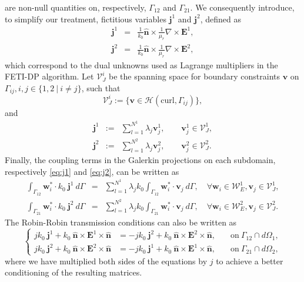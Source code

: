 \noindent are non-null quantities on, respectively, $\Gamma_{12}$ and $\Gamma_{21}$.
%
\noindent We consequently introduce, to simplify our treatment, fictitious variables $\mathbf{j}^1$ and $\mathbf{j}^2$, defined as
\begin{eqnarray}
\mathbf{j}^1 & = & \frac{1}{k_0} \hat{\mathbf{n}} \times \frac{1}{\mu_r} \nabla \times {\mathbf{E}^1},\\
\mathbf{j}^2 & = & \frac{1}{k_0} \hat{\mathbf{n}} \times \frac{1}{\mu_r} \nabla \times {\mathbf{E}^2},
\end{eqnarray}
\noindent which correspond to the dual unknowns used as Lagrange multipliers in the FETI-DP algorithm. Let $\mathcal{V}_J^i$ be the spanning space for boundary constraints $\mathbf{v}$ on $\Gamma_{ij}, i, j \in \lbrace1,2 \ | \ i \neq j\rbrace$, such that
$$\mathcal{V}_J^i := \{ \mathbf{v} \in \mathcal{H}(\mathrm{curl},\Gamma_{ij}) \},$$
\noindent and 
\begin{eqnarray}
\label{eq:auxfieldExp}
\mathbf{j}^1 &:= & \sum_{l=1}^{N^1} \lambda_j \mathbf{v}_j^1, \qquad \mathbf{v}_j^1 \in \mathcal{V}_J^1, \nonumber \\
\mathbf{j}^2 &:= & \sum_{l=1}^{N^2} \lambda_j \mathbf{v}_j^2, \qquad \mathbf{v}_j^2 \in \mathcal{V}_J^2.\nonumber
\end{eqnarray}
\noindent Finally, the coupling terms in the Galerkin projections on each subdomain, respectively \eqref{eq:j1} and \eqref{eq:j2}, can be written as
\begin{eqnarray}
\int_{\Gamma_{12}} \mathbf{w}_i^* \cdot k_0 \ \mathbf{j}^1 \ d\Gamma &= &\sum_{l=1}^{N^1} \lambda_j k_0 \int_{\Gamma_{12}} \mathbf{w}_i^* \cdot \mathbf{v}_j \ d\Gamma, \quad \forall \mathbf{w}_i \in \mathcal{W}_E^1, \mathbf{v}_j \in \mathcal{V}_J^1, \label{eq:j1form}\\
\int_{\Gamma_{21}} \mathbf{w}_i^* \cdot k_0 \ \mathbf{j}^2 \ d\Gamma &= &\sum_{l=1}^{N^2} \lambda_j k_0 \int_{\Gamma_{21}} \mathbf{w}_i^* \cdot \mathbf{v}_j \ d\Gamma, \quad \forall \mathbf{w}_i \in \mathcal{W}_E^2, \mathbf{v}_j \in \mathcal{V}_J^2.\label{eq:j2form}
\end{eqnarray}
%
\noindent The Robin-Robin transmission conditions can also be written as
\begin{equation}
\label{eq:RRTC}
\left\lbrace
\begin{aligned}
j k_0 \ \mathbf{j}^1 + k_0 \ \hat{\mathbf{n}} \times \mathbf{E}^1 \times \hat{\mathbf{n}} &=  - jk_0 \ \mathbf{j}^2 + k_0 \ \hat{\mathbf{n}} \times \mathbf{E}^2 \times \hat{\mathbf{n}},& \quad \mathrm{on} \ \Gamma_{12} \cap d\Omega_1,\\
j k_0 \ \mathbf{j}^2 + k_0 \ \hat{\mathbf{n}} \times \mathbf{E}^2 \times \hat{\mathbf{n}} &=  - jk_0 \ \mathbf{j}^1 + k_0 \ \hat{\mathbf{n}} \times \mathbf{E}^1 \times \hat{\mathbf{n}},& \quad \mathrm{on} \ \Gamma_{21} \cap d\Omega_2,
\end{aligned}
\right.
\end{equation}
\noindent where we have multiplied both sides of the equations by $j$ to achieve a better conditioning of the resulting matrices.

